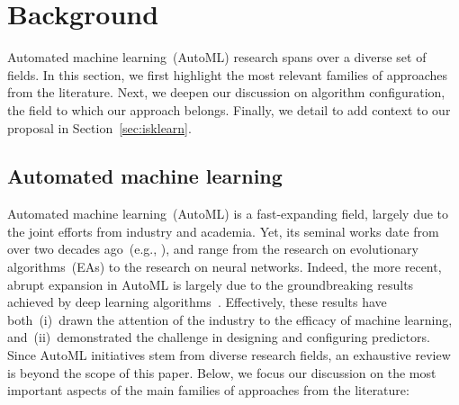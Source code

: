 \section{Background}
\label{sec:background}

Automated machine learning~(AutoML) research spans over a diverse set of fields. In this section, we first highlight the most relevant families of approaches from the literature. Next, we deepen our discussion on algorithm configuration, the field to which our approach belongs. Finally, we detail \irace to add context to our proposal in Section~\ref{sec:isklearn}.

%
%
\subsection{Automated machine learning}

Automated machine learning~(AutoML) is a fast-expanding field, largely due to the joint efforts from industry and academia. Yet, its seminal works date from over two decades ago~(e.g., \cite{RonSch1994}), and range from the research on evolutionary algorithms~(EAs) to the research on neural networks. Indeed, the more recent, abrupt expansion in AutoML is largely due to the groundbreaking results achieved by deep learning algorithms~\cite{LeCBenGeo2015dl}. Effectively, these results have both~(i)~drawn the attention of the industry to the efficacy of machine learning, and~(ii)~demonstrated the challenge in designing and configuring predictors.
Since AutoML initiatives stem from diverse research fields, an exhaustive review is beyond the scope of this paper. Below, we focus our discussion on the most important aspects of the main families of approaches from the literature:

